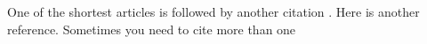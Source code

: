 \documentclass[12pt]{article}
\begin{document}

One of the shortest articles \cite{lander1966counterexample} is followed by another citation \cite{ulmer1951protein}. Here is another reference. Sometimes you need to cite more than one \cite{lander1966counterexample,ulmer1951protein,hakkio1986does}

\printbibliography

\end{document}
